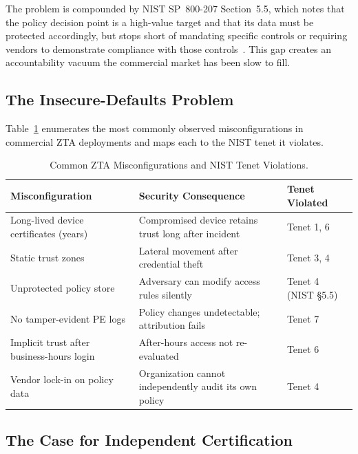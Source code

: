 \documentclass[sigconf,nonacm]{acmart}
\begin{document}
The problem is compounded by NIST SP~800-207 Section~5.5, which notes that the
policy decision point is a high-value target and that its data must be protected
accordingly, but stops short of mandating specific controls or requiring vendors
to demonstrate compliance with those controls~\cite{nist800207}. This gap creates
an accountability vacuum the commercial market has been slow to fill.

\subsection{The Insecure-Defaults Problem}

Table~\ref{tab:defaults} enumerates the most commonly observed misconfigurations
in commercial ZTA deployments and maps each to the NIST tenet it violates.

\begin{table}[htbp]
\centering
\caption{Common ZTA Misconfigurations and NIST Tenet Violations.}
\label{tab:defaults}
\small
\setlength{\tabcolsep}{5pt}
\begin{tabularx}{\textwidth}{@{}p{3.4cm}Xp{2.7cm}@{}}
\toprule
\textbf{Misconfiguration} & \textbf{Security Consequence} & \textbf{Tenet Violated} \\
\midrule
Long-lived device certificates (years)  &
  Compromised device retains trust long after incident  & Tenet 1, 6 \\
\addlinespace[3pt]
Static trust zones                       &
  Lateral movement after credential theft               & Tenet 3, 4 \\
\addlinespace[3pt]
Unprotected policy store                 &
  Adversary can modify access rules silently             & Tenet 4 (NIST \S5.5) \\
\addlinespace[3pt]
No tamper-evident PE logs                &
  Policy changes undetectable; attribution fails         & Tenet 7 \\
\addlinespace[3pt]
Implicit trust after business-hours login &
  After-hours access not re-evaluated                    & Tenet 6 \\
\addlinespace[3pt]
Vendor lock-in on policy data            &
  Organization cannot independently audit its own policy & Tenet 4 \\
\bottomrule
\end{tabularx}
\end{table}

\subsection{The Case for Independent Certification}
\end{document}
